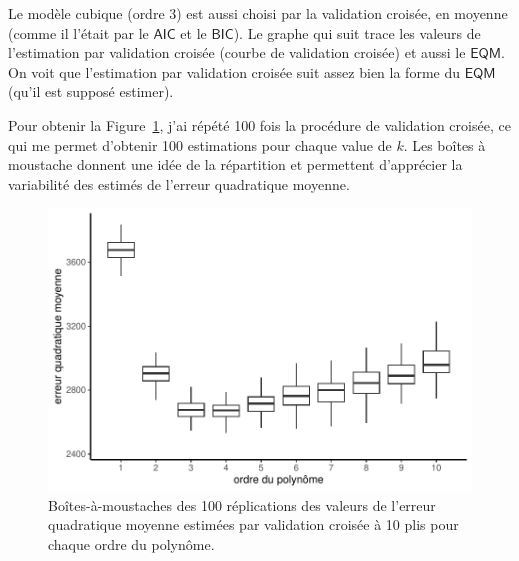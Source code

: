 \documentclass[
  11pt,
  letterpaper,
]{scrbook}
\theoremstyle{definition}
\theoremstyle{remark}
\begin{document}
Le modèle cubique (ordre 3) est aussi choisi par la validation croisée,
en moyenne (comme il l'était par le \(\mathsf{AIC}\) et le
\(\mathsf{BIC}\)). Le graphe qui suit trace les valeurs de l'estimation
par validation croisée (courbe de validation croisée) et aussi le
\(\mathsf{EQM}\). On voit que l'estimation par validation croisée suit
assez bien la forme du \(\mathsf{EQM}\) (qu'il est supposé estimer).

Pour obtenir la Figure~\ref{fig-plotcv}, j'ai répété 100 fois la
procédure de validation croisée, ce qui me permet d'obtenir 100
estimations pour chaque value de \(k\). Les boîtes à moustache donnent
une idée de la répartition et permettent d'apprécier la variabilité des
estimés de l'erreur quadratique moyenne.

\begin{figure}[ht!]

{\centering \includegraphics[width=1\textwidth,height=\textheight]{selectionmodeles_files/figure-pdf/fig-plotcv-1.pdf}

}

\caption{\label{fig-plotcv}Boîtes-à-moustaches des 100 réplications des
valeurs de l'erreur quadratique moyenne estimées par validation croisée
à 10 plis pour chaque ordre du polynôme.}

\end{figure}
\end{document}
